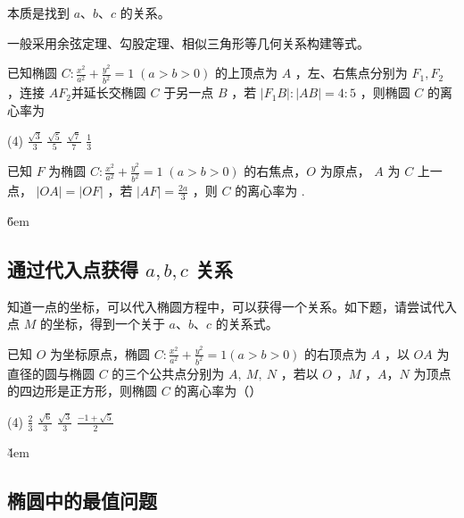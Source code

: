 \begin{tips}
    本质是找到 $a$、$b$、$c$ 的关系。

    一般采用余弦定理、勾股定理、相似三角形等几何关系构建等式。
\end{tips}

\begin{example}
    已知椭圆 $C: \frac{x^{2}}{a^{2}}+\frac{y^{2}}{b^{2}}=1\;(a>b>0)$ 的上顶点为 $A$ ，左、右焦点分别为 $F_{1}, F_{2}$ ，连接 $A F_{2}$并延长交椭圆 $C$ 于另一点 $B$ ，若 $|F_{1} B|:|A B|=4:5$ ，则椭圆 $C$ 的离心率为
    \begin{tasks}(4)
        \task $\frac{\sqrt{3}}{3}$
        \task $\frac{\sqrt{5}}{5}$
        \task $\frac{\sqrt{7}}{7}$
        \task $\frac{1}{3}$
    \end{tasks}
\end{example}

\begin{example}
    已知 $F$ 为椭圆 $C: \frac{x^{2}}{a^{2}}+\frac{y^{2}}{b^{2}}=1\;(a>b>0)$ 的右焦点，$O$ 为原点， $A$ 为 $C$ 上一点， $|OA|=|OF|$ ，若 $|AF|=\frac{2a}{3}$ ，则 $C$ 的离心率为 \underline{\hspace{3cm}}.
\end{example}

\v{6em}

\subsection{通过代入点获得 $a,b,c$ 关系}

\begin{theorem}
    知道一点的坐标，可以代入椭圆方程中，可以获得一个关系。如下题，请尝试代入点 $M$ 的坐标，得到一个关于 $a$、$b$、$c$ 的关系式。
\end{theorem}

\begin{problem}
已知 $O$ 为坐标原点，椭圆 $C: \frac{x^2}{a^2}+\frac{y^2}{b^2}=1(a>b>0)$ 的右顶点为 $A$ ，以 $O A$ 为直径的圆与椭圆 $C$ 的三个公共点分别为 $A, ~ M, ~ N$ ，若以 $O$ ，$M$ ，$A$，$N$ 为顶点的四边形是正方形，则椭圆 $C$ 的离心率为（\hspace{2em}）
\begin{tasks}(4)
    \task $\frac{2}{3}$
    \task $\frac{\sqrt{6}}{3}$
    \task $\frac{\sqrt{3}}{3}$
    \task $\frac{-1+\sqrt{5}}{2}$
\end{tasks}
\end{problem}

\v{4em}

\subsection{椭圆中的最值问题}

